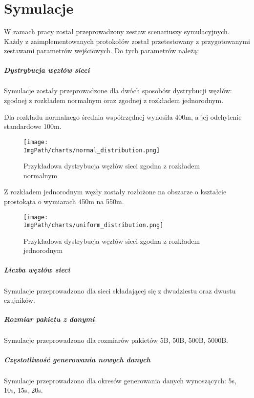 \chapter{Symulacje}
W ramach pracy został przeprowadzony zestaw scenariuszy symulacyjnych. Każdy z zaimplementowanych protokołów został przetestowany z przygotowanymi zestawami parametrów wejściowych.
Do tych parametrów należą:
\paragraph{Dystrybucja węzłów sieci}
Symulacje zostały przeprowadzone dla dwóch sposobów dystrybucji węzłów: zgodnej z rozkładem normalnym oraz zgodnej z rozkładem jednorodnym.

Dla rozkładu normalnego średnia współrzędnej wynosiła 400m, a jej odchylenie standardowe 100m.

\begin{figure}[!htbp]
	\begin{center}
		\texttt{[image: \\ImgPath/charts/normal\_distribution.png]}
	\end{center}
	\caption{Przykładowa dystrybucja węzłów sieci zgodna z rozkładem normalnym}
\end{figure}

Z rozkładem jednorodnym węzły zostały rozłożone na obszarze o kształcie prostokąta o wymiarach 450m na 550m.

\begin{figure}[!htbp]
	\begin{center}
		\texttt{[image: \\ImgPath/charts/uniform\_distribution.png]}
	\end{center}
	\caption{Przykładowa dystrybucja węzłów sieci zgodna z rozkładem jednorodnym}
\end{figure}

\paragraph{Liczba węzłów sieci}
Symulacje przeprowadzono dla sieci składającej się z dwudziestu oraz dwustu czujników.
\paragraph{Rozmiar pakietu z danymi}
Symulacje przeprowadzono dla rozmiarów pakietów 5B, 50B, 500B, 5000B.
\paragraph{Częstotliwość generowania nowych danych}
Symulacje przeprowadzono dla okresów generowania danych wynoszących: 5s, 10s, 15s, 20s.
